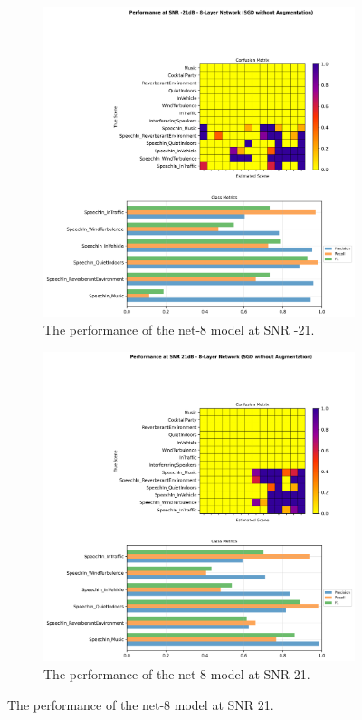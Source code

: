 \documentclass[logo,bsc,singlespacing,parskip,online]{infthesis}
\begin{document}
\begin{figure}[h]
   \centering
   \begin{subfigure}[b]{0.48\textwidth}
      \centering
      \includegraphics[width=\textwidth]{net-8/FIXED-fixed-lr-sgd/snr_-21_performance.png}
      \caption{The performance of the net-8 model at SNR -21.}
      \label{fig:fixed-lr-sgd-snr--21}
   \end{subfigure}
   \hfill
   \begin{subfigure}[b]{0.48\textwidth}
      \centering
      \includegraphics[width=\textwidth]{net-8/FIXED-fixed-lr-sgd/snr_21_performance.png}
      \caption{The performance of the net-8 model at SNR 21.}
      \label{fig:fixed-lr-sgd-snr-21}
   \end{subfigure}
\end{figure}
\end{document}
